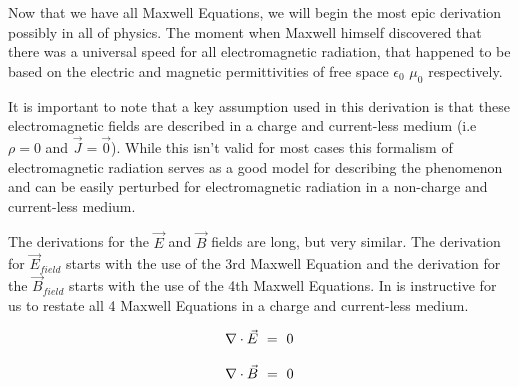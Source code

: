 \documentclass{article}
\begin{document}
Now that we have all Maxwell Equations, we will begin the most epic derivation possibly in all of physics. The moment when Maxwell himself discovered that there was a universal speed for all electromagnetic radiation, that happened to be based on the electric and magnetic permittivities of free space \begin{math} \epsilon_{0} \end{math} \begin{math} \mu_{0} \end{math} respectively. 

It is important to note that a key assumption used in this derivation is that these electromagnetic fields are described in a charge and current-less medium (i.e \begin{math} \rho = 0 \end{math} and \begin{math} \vec{J} = \vec{0} \end{math}). While this isn't valid for most cases this formalism of electromagnetic radiation serves as a good model for describing the phenomenon and can be easily perturbed for electromagnetic radiation in a non-charge and current-less medium. 

The derivations for the \begin{math} \vec{E} \end{math} and \begin{math} \vec{B} \end{math} fields are long, but very similar. The derivation for \begin{math} \vec{E}_{field} \end{math} starts with the use of the 3rd Maxwell Equation and the derivation for the \begin{math} \vec{B}_{field} \end{math} starts with the use of the 4th Maxwell Equations. In is instructive for us to restate all 4 Maxwell Equations in a charge and current-less medium. 

\begin{equation} \label{eq:1000}
\nabla\cdot\vec{E} \hspace{0.125cm} = \hspace{0.125cm} 0 
\end{equation}

\begin{equation} \label{eq:1001}
\nabla\cdot\vec{B} \hspace{0.125cm} = \hspace{0.125cm} 0
\end{equation}
\end{document}
